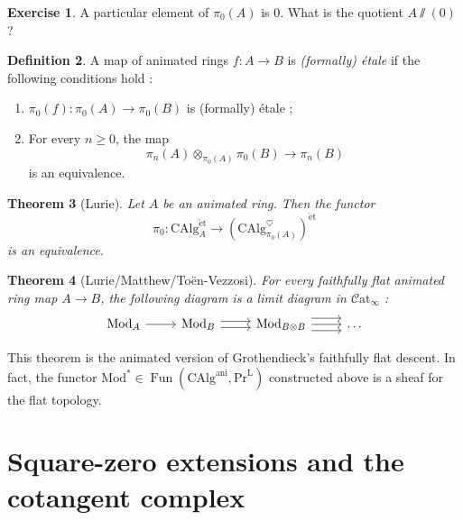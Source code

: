 \documentclass[11pt]{article}
\newtheorem{theorem}{Theorem}[section]
\theoremstyle{definition}
\newtheorem{definition}[theorem]{Definition}
\newtheorem{exercise}[theorem]{Exercise}
\newcommand{\ani}{\mathrm{ani}}
\newcommand{\CAlg}{\mathrm{CAlg}}
\newcommand{\Catinf}{\mathcal{C}\mathrm{at}_{\infty}}
\newcommand{\et}{\mathrm{\acute{e}t}}
\newcommand{\Fun}{\operatorname{Fun}}
\newcommand{\heart}{\heartsuit}
\newcommand{\Mod}{\mathrm{Mod}}
\newcommand{\PrL}{\mathrm{Pr}^{\mathrm{L}}}
\begin{document}
\begin{exercise}
    A particular element of $\pi_0(A)$ is $0$.
    What is the quotient $A\sslash(0)$ ?
\end{exercise}

\begin{definition}
    A map of animated rings $f : A \to B$ is \emph{(formally) étale} if the following conditions hold :
    \begin{enumerate}
        \item $\pi_0(f) : \pi_0(A) \to \pi_0(B)$ is (formally) étale ;
        \item For every $n \geq 0$, the map
        \[
            \pi_n(A) \otimes_{\pi_0(A)} \pi_0(B) \to \pi_n(B)
        \]
        is an equivalence.
    \end{enumerate}
\end{definition}

\begin{theorem}[Lurie]
    Let $A$ be an animated ring.
    Then the functor
    \[
        \pi_0 : \CAlg_A^{\et} \to \left(\CAlg_{\pi_0(A)}^{\heart}\right)^{\et}
    \]
    is an equivalence.
\end{theorem}

\begin{theorem}[Lurie/Matthew/Toën-Vezzosi]
    For every faithfully flat animated ring map $A \to B$, the following diagram is a limit diagram in $\Catinf$ :
    \[\begin{tikzcd}
        {\Mod_A} & {\Mod_B} & {\Mod_{B\otimes B}} & \dots
        \arrow[from=1-1, to=1-2]
        \arrow[shift left, from=1-2, to=1-3]
        \arrow[shift right, from=1-2, to=1-3]
        \arrow[from=1-3, to=1-4]
        \arrow[shift left=2, from=1-3, to=1-4]
        \arrow[shift right=2, from=1-3, to=1-4]
    \end{tikzcd}\]
\end{theorem}
This theorem is the animated version of Grothendieck's faithfully flat descent.
In fact, the functor $\Mod^* \in \Fun(\CAlg^{\ani}, \PrL)$ constructed above is a sheaf for the flat topology.

\section{Square-zero extensions and the cotangent complex}
\end{document}
